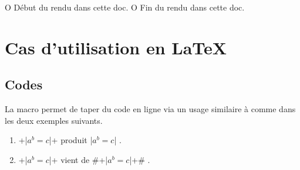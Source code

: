


\usepackage[lang = FR]{../main/main}
\usepackage{../macroenv/macroenv}
\usepackage{../inenglish/inenglish}
\usepackage{../showcase/showcase}
\usepackage{../rem-exa/rem-exa}


\usepackage{listing}





                       { O{ Début du rendu dans cette doc. }
                         O{ Fin du rendu dans cette doc. } }{
    \begin{colorstrip}{green!5}
        \smallskip
}{
        \smallskip
        \bdocextraruler{#2}
    \end{colorstrip}
}




\section{Cas d'utilisation en \LaTeX}

\subsection{Codes }

La macro  permet de taper du code en ligne via un usage similaire à  comme dans les deux exemples suivants.

\begin{enumerate}
    \item \docinlatex+\docinlatex|$a^b = c$|+ produit \docinlatex|$a^b = c$| .

    \item \docinlatex+\docinlatex|$a^b = c$|+ vient de \docinlatex#\docinlatex+\docinlatex|$a^b = c$|+# .
\end{enumerate}


